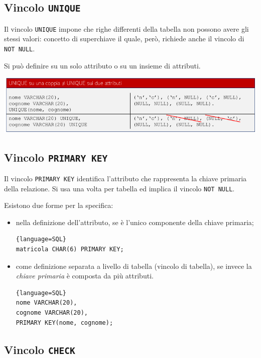 \documentclass[11pt]{report}
\begin{document}
\subsection{Vincolo \texttt{UNIQUE}}

Il vincolo \texttt{UNIQUE} impone che righe differenti della tabella non possono avere gli stessi valori: concetto di superchiave il quale, per\`o, richiede anche il vincolo di \texttt{NOT NULL}.

Si pu\`o definire su un solo attributo o su un insieme di attributi. 

\begin{center}
\includegraphics[scale=0.5]{vincolo-unique}
\end{center}

\subsection{Vincolo \texttt{PRIMARY KEY}}

Il vincolo \texttt{PRIMARY KEY} identifica l'attributo che rappresenta la chiave primaria della relazione. Si usa una volta per tabella ed implica il vincolo \texttt{NOT NULL}.

Esistono due forme per la specifica:
\begin{itemize}
\item nella definizione dell'attributo, se \`e l'unico componente della chiave primaria;
\begin{lstlisting}{language=SQL}
matricola CHAR(6) PRIMARY KEY;
\end{lstlisting}
\item come definizione separata a livello di tabella (vincolo di tabella), se invece la \emph{chiave primaria} \`e composta da pi\`u attributi.
\begin{lstlisting}{language=SQL}
nome VARCHAR(20),
cognome VARCHAR(20), 
PRIMARY KEY(nome, cognome);
\end{lstlisting}
\end{itemize}
\newpage
\subsection{Vincolo \texttt{CHECK}}
\end{document}
